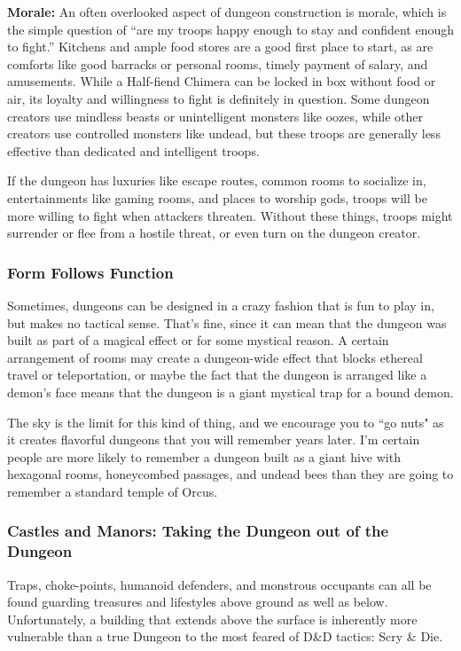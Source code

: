 \textbf{Morale:} An often overlooked aspect of dungeon construction is morale, which is the simple question of ``are my troops happy enough to stay and confident enough to fight.'' Kitchens and ample food stores are a good first place to start, as are comforts like good barracks or personal rooms, timely payment of salary, and amusements. While a Half-fiend Chimera can be locked in box without food or air, its loyalty and willingness to fight is definitely in question. Some dungeon creators use mindless beasts or unintelligent monsters like oozes, while other creators use controlled monsters like undead, but these troops are generally less effective than dedicated and intelligent troops.

If the dungeon has luxuries like escape routes, common rooms to socialize in, entertainments like gaming rooms, and places to worship gods, troops will be more willing to fight when attackers threaten. Without these things, troops might surrender or flee from a hostile threat, or even turn on the dungeon creator.

\subsubsection{Form Follows Function}

Sometimes, dungeons can be designed in a crazy fashion that is fun to play in, but makes no tactical sense. That's fine, since it can mean that the dungeon was built as part of a magical effect or for some mystical reason. A certain arrangement of rooms may create a dungeon-wide effect that blocks ethereal travel or teleportation, or maybe the fact that the dungeon is arranged like a demon's face means that the dungeon is a giant mystical trap for a bound demon.

The sky is the limit for this kind of thing, and we encourage you to ``go nuts" as it creates flavorful dungeons that you will remember years later. I'm certain people are more likely to remember a dungeon built as a giant hive with hexagonal rooms, honeycombed passages, and undead bees than they are going to remember a standard temple of Orcus.

\subsubsection{Castles and Manors: Taking the Dungeon out of the Dungeon}

Traps, choke-points, humanoid defenders, and monstrous occupants can all be found guarding treasures and lifestyles above ground as well as below. Unfortunately, a building that extends above the surface is inherently more vulnerable than a true Dungeon to the most feared of D\&D tactics: Scry \& Die.

